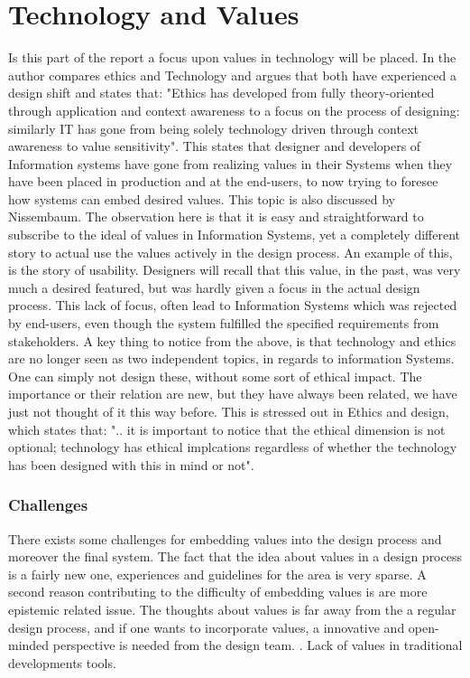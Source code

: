 
\section{Technology and Values}
Is this part of the report a focus upon values in technology will be placed. In  the author compares ethics and Technology and argues that both have experienced a design shift and states that: "Ethics has developed from fully theory-oriented through application and context awareness to a focus on the process of designing: similarly IT has gone from being solely technology driven through context awareness to value sensitivity". This states that designer and developers of Information systems have gone from realizing values in their Systems when they have been placed in production and at the end-users, to now trying to foresee how systems can embed desired values. This topic is also discussed by Nissembaum. The observation here is that it is easy and straightforward to subscribe to the ideal of values in Information Systems, yet a completely different story to actual use the values actively in the design process. An example of this, is the story of usability. Designers will recall that this value, in the past, was very much a desired featured, but was hardly given a focus in the actual design process. This lack of focus, often lead to Information Systems which was rejected by end-users, even though the system fulfilled the specified requirements from stakeholders. %
A key thing to notice from the above, is that technology and ethics are no longer seen as two independent topics, in regards to information Systems. One can simply not design these, without some sort of ethical impact. The importance or their relation are new, but they have always been related, we have just not thought of it this way before. This is stressed out in Ethics and design, which states that: ".. it is important to notice that the ethical dimension is not optional; technology has ethical implcations regardless of whether the technology has been designed with this in mind or not". 

\subsubsection{Challenges}
There exists some challenges for embedding values into the design process and moreover the final system. The fact that the idea about values in a design process is a fairly new one, experiences and guidelines for the area is very sparse. A second reason  contributing to the difficulty of embedding values is are more epistemic related issue. The thoughts about values is far away from the a regular design process, and if one wants to incorporate values, a innovative and open-minded perspective is needed from the design team. . 
Lack of values in traditional developments tools. 


